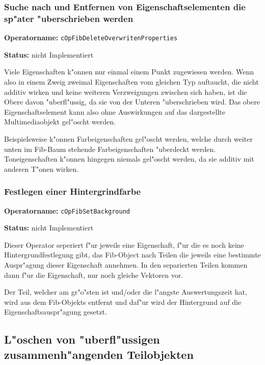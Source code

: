 \subsubsection{Suche nach und Entfernen von Eigenschaftselementen die sp"ater "uberschrieben werden}

\textbf{Operatorname:} \verb|cOpFibDeleteOverwritenProperties|

\bigskip\noindent
\textbf{Status:} nicht Implementiert

\bigskip\noindent
Viele Eigenschaften k"onnen nur einmal einem Punkt zugewiesen werden. Wenn also in einem Zweig zweimal Eigenschaften vom gleichen Typ auftaucht, die nicht additiv wirken und keine weiteren Verzweigungen zwischen sich haben, ist die Obere davon "uberfl"ussig, da sie von der Unteren "uberschrieben wird. Das obere Eigenschaftselement kann also ohne Auswirkungen auf das dargestellte Multimediaobjekt gel"oscht werden.

Beispielsweise k"onnen Farbeigenschaften gel"oscht werden, welche durch weiter unten im Fib-Baum stehende Farbeigenschaften "uberdeckt werden. Toneigenschaften k"onnen hingegen niemals gel"oscht werden, da sie additiv mit anderen T"onen wirken.


\subsubsection{Festlegen einer Hintergrindfarbe}

\textbf{Operatorname:} \verb|cOpFibSetBackground|

\bigskip\noindent
\textbf{Status:} nicht Implementiert

\bigskip\noindent
Dieser Operator seperiert f"ur jeweils eine Eigenschaft, f"ur die es noch keine Hintergrundfestlegung gibt, das Fib-Object nach Teilen die jeweils eine bestimmte Auspr"agung dieser Eigenschaft annehmen. In den separierten Teilen kommen dann f"ur die Eigenschaft, nur noch gleiche Vektoren vor.

Der Teil, welcher am gr"o"sten ist und/oder die l"angste Auswertungszeit hat, wird aus dem Fib-Objekts entfernt und daf"ur wird der Hintergrund auf die Eigenschaftsauspr"agung gesetzt.


\subsection{L"oschen von "uberfl"ussigen zusammenh"angenden Teilobjekten}

